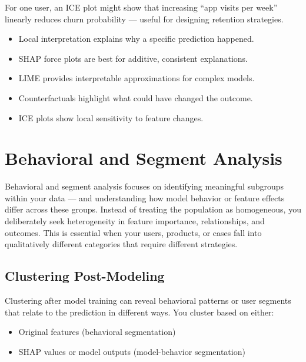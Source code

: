 \documentclass[12pt,openany]{book}
\begin{document}
\begin{examplebox}
For one user, an ICE plot might show that increasing ``app visits per week'' linearly reduces churn probability — useful for designing retention strategies.
\end{examplebox}

\begin{summarybox}
\begin{itemize}
  \item Local interpretation explains why a specific prediction happened.
  \item SHAP force plots are best for additive, consistent explanations.
  \item LIME provides interpretable approximations for complex models.
  \item Counterfactuals highlight what could have changed the outcome.
  \item ICE plots show local sensitivity to feature changes.
\end{itemize}
\end{summarybox}




\chapter{Behavioral and Segment Analysis}

Behavioral and segment analysis focuses on identifying meaningful subgroups within your data — and understanding how model behavior or feature effects differ across these groups. Instead of treating the population as homogeneous, you deliberately seek heterogeneity in feature importance, relationships, and outcomes. This is essential when your users, products, or cases fall into qualitatively different categories that require different strategies.



\section{Clustering Post-Modeling}

Clustering after model training can reveal behavioral patterns or user segments that relate to the prediction in different ways. You cluster based on either:
\begin{itemize}
  \item Original features (behavioral segmentation)
  \item SHAP values or model outputs (model-behavior segmentation)
\end{itemize}
\end{document}
